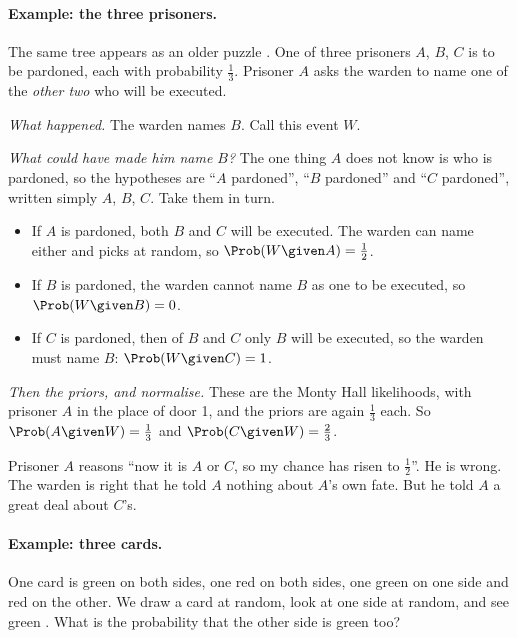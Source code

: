 \paragraph{Example: the three prisoners.}
The same tree appears as an older puzzle .
One of three prisoners $A$, $B$, $C$ is to be pardoned, each with probability
$\tfrac13$. Prisoner $A$ asks the warden to name one of the \emph{other two} who
will be executed.

\emph{What happened.} The warden names $B$. Call this event $W$.

\emph{What could have made him name $B$?} The one thing $A$ does not know is who
is pardoned, so the hypotheses are ``$A$ pardoned'', ``$B$ pardoned'' and ``$C$
pardoned'', written simply $A$, $B$, $C$. Take them in turn.
\begin{itemize}[leftmargin=1.5em,itemsep=1pt]
  \item If $A$ is pardoned, both $B$ and $C$ will be executed. The warden can name
        either and picks at random, so $\Prob(W\given A)=\tfrac12$.
  \item If $B$ is pardoned, the warden cannot name $B$ as one to be executed, so
        $\Prob(W\given B)=0$.
  \item If $C$ is pardoned, then of $B$ and $C$ only $B$ will be executed, so the
        warden must name $B$: $\Prob(W\given C)=1$.
\end{itemize}
\emph{Then the priors, and normalise.} These are the Monty Hall likelihoods, with
prisoner $A$ in the place of door 1, and the priors are again $\tfrac13$ each. So
$\Prob(A\given W)=\tfrac13$ and $\Prob(C\given W)=\tfrac23$.

Prisoner $A$ reasons ``now it is $A$ or $C$, so my chance has risen to
$\tfrac12$''. He is wrong. The warden is right that he told $A$ nothing about
$A$'s own fate. But he told $A$ a great deal about $C$'s.

\paragraph{Example: three cards.}
One card is green on both sides, one red on both sides, one green on one side
and red on the other. We draw a card at random, look at one side at random,
and see green . What is the probability that the other
side is green too?

